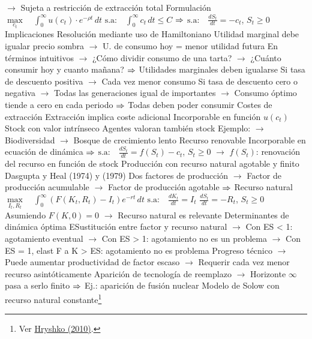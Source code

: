 \documentclass{nuevotema}
\begin{document}
\begin{esquemal}
				\4[] $\to$ Sujeta a restricción de extracción total
				\4 Formulación
				\4[] $\underset{c_t}{\max} \quad \int_0^\infty u(c_t) \cdot e^{-\rho t} \, dt$
				\4[] $\text{s.a:} \quad \int_0^\infty c_t \, dt \leq C$
				\4[] $\Rightarrow$ $\text{s.a:} \quad \frac{d S_t}{d t} = -c_t$, $S_t \geq 0$
				\4 Implicaciones
				\4[] Resolución mediante uso de Hamiltoniano
				\4[] Utilidad marginal debe igualar precio sombra
				\4[] $\to$ U. de consumo hoy = menor utilidad futura
				\4[] En términos intuitivos
				\4[] $\to$ ¿Cómo dividir consumo de una tarta?
				\4[] $\to$ ¿Cuánto consumir hoy y cuanto mañana?
				\4[] $\Rightarrow$ Utilidades marginales deben igualarse
				\4[] Si tasa de descuento positiva
				\4[] $\to$ Cada vez menor consumo
				\4[] Si tasa de descuento cero o negativa
				\4[] $\to$ Todas las generaciones igual de importantes
				\4[] $\to$ Consumo óptimo tiende a cero en cada periodo
				\4[] $\Rightarrow$ Todas deben poder consumir
				\4 Costes de extracción
				\4[] Extracción implica coste adicional
				\4[] Incorporable en función $u(c_t)$
				\4 Stock con valor intrínseco
				\4[] Agentes valoran también stock
				\4[] Ejemplo:
				\4[] $\to$ Biodiversidad
				\4[] $\to$ Bosque de crecimiento lento
				\4 Recurso renovable
				\4[] Incorporable en ecuación de dinámica
				\4[] $\Rightarrow$ $\text{s.a:} \quad \frac{d S_t}{d t} = f(S_t) -c_t$, $S_t \geq 0$
				\4[] $\to$ $f(S_t)$: renovación del recurso en función de stock
			\3 Producción con recurso natural agotable y  finito
				\4 Dasgupta y Heal (1974) y (1979)
				\4 Dos factores de producción
				\4[] $\to$ Factor de producción acumulable
				\4[] $\to$ Factor de producción agotable $\Rightarrow$ Recurso natural
				\4[] $\underset{I_t, R_t}{\max} \quad \int_0^\infty \left( F(K_t, R_t) - I_t \right) e^{-r t} \, dt$
				\4[] $\text{s.a:} \quad \frac{d K_t}{d t} = I_t$
				\4[] \quad \quad $\frac{d S_t}{d t} = - R_t$, $S_t \geq 0$
				\4 Asumiendo $F(K,0) = 0$
				\4[] $\to$ Recurso natural es relevante
				\4 Determinantes de dinámica óptima
				\4[--] ESustitución entre factor y recurso natural
				\4[] $\to$ Con ES < 1: agotamiento eventual
				\4[] $\to$ Con ES > 1: agotamiento no es un problema
				\4[] $\to$ Con ES = 1, elast F a K > ES: agotamiento no es problema
				\4[--] Progreso técnico
				\4[] $\to$ Puede aumentar productividad de factor escaso
				\4[] $\to$ Requerir cada vez menor recurso asintóticamente
				\4[--] Aparición de tecnología de reemplazo
				\4[] $\to$ Horizonte $\infty$ pasa a serlo finito
				\4[] $\Rightarrow$ Ej.: aparición de fusión nuclear
			\3 Modelo de Solow con recurso natural constante\footnote{Ver \href{http://www.artsrn.ualberta.ca/econweb/hryshko/econ403fall2010/CHAPTER9.pdf}{Hryshko (2010)}.}

\end{esquemal}
\end{document}
